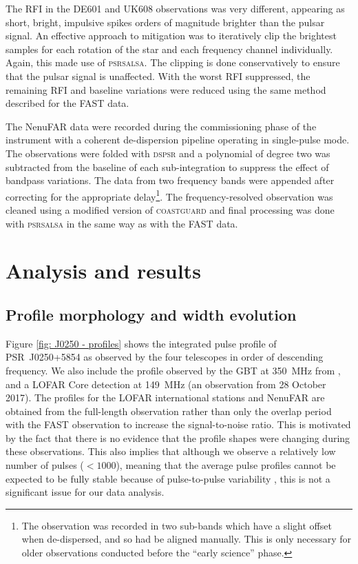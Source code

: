 The RFI in the DE601 and UK608 observations was very different, appearing as short, bright, impulsive spikes orders of magnitude brighter than the pulsar signal. An effective approach to mitigation was to iteratively clip the brightest samples for each rotation of the star and each frequency channel individually. Again, this made use of \textsc{psrsalsa}. The clipping is done conservatively to ensure that the pulsar signal is unaffected. With the worst RFI suppressed, the remaining RFI and baseline variations were reduced using the same method described for the FAST data.

The NenuFAR data were recorded during the commissioning phase of the instrument with a coherent de-dispersion pipeline \citep[LUPPI;][]{BGT+2020} operating in single-pulse mode. The observations were folded with \textsc{dspsr} and a polynomial of degree two was subtracted from the baseline of each sub-integration to suppress the effect of bandpass variations. The data from two frequency bands were appended after correcting for the appropriate delay\footnote{The observation was recorded in two sub-bands which have a slight offset when de-dispersed, and so had be aligned manually. This is only necessary for older observations conducted before the ``early science'' phase.}. The frequency-resolved observation was cleaned using a modified version of \textsc{coastguard} \citep{LKG+2016} and final processing was done with \textsc{psrsalsa} in the same way as with the FAST data.



\section{Analysis and results}
\label{sec: J0250 - analysis}


\subsection{Profile morphology and width evolution}
\label{sec: J0250 - analysis - profile widths}

Figure \ref{fig: J0250 - profiles} shows the integrated pulse profile of PSR~J0250+5854 as observed by the four telescopes in order of descending frequency. We also include the profile observed by the GBT at 350~MHz from \citet{TBC+2018}, and a LOFAR Core detection at 149~MHz (an observation from 28 October 2017). The profiles for the LOFAR international stations and NenuFAR are obtained from the full-length observation rather than only the overlap period with the FAST observation to increase the signal-to-noise ratio. This is motivated by the fact that there is no evidence that the profile shapes were changing during these observations. This also implies that although we observe a relatively low number of pulses ($<1000$), meaning that the average pulse profiles cannot be expected to be fully stable because of pulse-to-pulse variability \citep[e.g.][]{HMTx1975,RRxx1995,LKL+2012}, this is not a significant issue for our data analysis.

